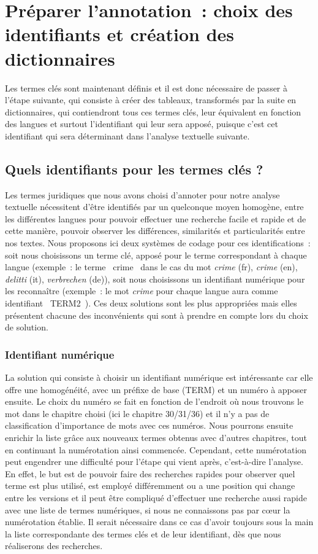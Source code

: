 \section{Préparer l'annotation~: choix des identifiants et création des dictionnaires}
Les termes clés sont maintenant définis et il est donc nécessaire de passer à l'étape suivante, qui consiste à créer des tableaux, transformés par la suite en dictionnaires, qui contiendront tous ces termes clés, leur équivalent en fonction des langues et surtout l'identifiant qui leur sera apposé, puisque c'est cet identifiant qui sera déterminant dans l'analyse textuelle suivante. 

\subsection{Quels identifiants pour les termes clés ?}
Les termes juridiques que nous avons choisi d'annoter pour notre analyse textuelle nécessitent d'être identifiés par un quelconque moyen homogène, entre les différentes langues pour pouvoir effectuer une recherche facile et rapide et de cette manière, pouvoir observer les différences, similarités et particularités entre nos textes. Nous proposons ici deux systèmes de codage pour ces identifications~: soit nous choisissons un terme clé, apposé pour le terme correspondant à chaque langue (exemple~: le terme \og~crime~\fg{} dans le cas du mot \textit{crime} (fr), \textit{crime} (en), \textit{delitti} (it), \textit{verbrechen} (de)), soit nous choisissons un identifiant numérique pour les reconnaître (exemple~: le mot \textit{crime} pour chaque langue aura comme identifiant \og~TERM2~\fg{}). Ces deux solutions sont les plus appropriées mais elles présentent chacune des inconvénients qui sont à prendre en compte lors du choix de solution.

\subsubsection{Identifiant numérique}
La solution qui consiste à choisir un identifiant numérique est intéressante car elle offre une homogénéité, avec un préfixe de base (TERM) et un numéro à apposer ensuite. Le choix du numéro se fait en fonction de l'endroit où nous trouvons le mot dans le chapitre choisi (ici le chapitre 30/31/36) et il n'y a pas de classification d'importance de mots avec ces numéros. Nous pourrons ensuite enrichir la liste grâce aux nouveaux termes obtenus avec d'autres chapitres, tout en continuant la numérotation ainsi commencée. Cependant, cette numérotation peut engendrer une difficulté pour l'étape qui vient après, c'est-à-dire l'analyse. En effet, le but est de pouvoir faire des recherches rapides pour observer quel terme est plus utilisé, est employé différemment ou a une position qui change entre les versions et il peut être compliqué d'effectuer une recherche aussi rapide avec une liste de termes numériques, si nous ne connaissons pas par c\oe ur la numérotation établie. Il serait nécessaire dans ce cas d'avoir toujours sous la main la liste correspondante des termes clés et de leur identifiant, dès que nous réaliserons des recherches. 

